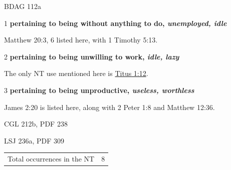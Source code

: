 				\begin{compactdesc}
					\item[BDAG 112a] \textbf{}
						\begin{compactitem}
							\item[1] \textbf{pertaining to being without anything to do, \textit{unemployed, idle}}
								\begin{compactitem}
									\item Matthew 20:3, 6 listed here, with 1 Timothy 5:13.
								\end{compactitem}
							\item[2] \textbf{pertaining to being unwilling to work, \textit{idle, lazy}}
								\begin{compactitem}
									\item The only NT use mentioned here is \hyperref[TITUS-1-12]{Titus 1:12}.
								\end{compactitem}
							\item[3] \textbf{pertaining to being unproductive, \textit{useless, worthless}}
								\begin{compactitem}
									\item James 2:20 is listed here, along with 2 Peter 1:8 and Matthew 12:36.
								\end{compactitem}
						\end{compactitem}
					\item[CGL 212b, PDF 238] \textbf{}
						\begin{compactitem}
							\item 
						\end{compactitem}
					\item[LSJ 236a, PDF 309] \textbf{}
						\begin{compactitem}
							\item 
						\end{compactitem}
				\end{compactdesc}
				
				\begin{tabular}{ll}
					Total occurrences in the NT & 8
				\end{tabular}
				
